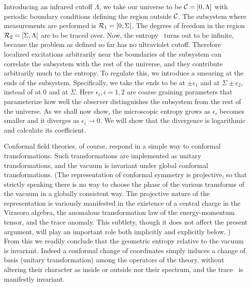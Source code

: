 Introducing
an infrared cutoff $\Lambda$,
we take our universe to be ${\cal C}=[0,\Lambda [$ with
periodic boundary conditions defining the region outside $\cal C$.
The subsystem where measurements are performed is ${\cal R}_1=[0,\Sigma [$.
The degrees of freedom in the region ${\cal R}_2=[\Sigma,\Lambda [$ are to
be traced over.
Now, the entropy \sa~turns out to be
infinite, because the problem as defined so far has
no ultraviolet cutoff.  Therefore localized excitations arbitrarily
near the boundaries of the subsystem can correlate the subsystem
with the rest of the universe, and they contribute arbitrarily much
to the entropy. To regulate this, we introduce a smearing at
the ends of the subsystem.  Specifically, we take the ends to be at
$\pm\epsilon_1$ and at $\Sigma\pm\epsilon_2$, instead of at $0$ and at
$\Sigma$. Here
$\epsilon_i, i=1,2$ are coarse graining
parameters that parameterize how well the observer distinguishes
the subsystem from the rest of the universe.
As we shall now show,
the microscopic entropy grows as $\epsilon_i$ becomes smaller
and it diverges as $\epsilon_i\rightarrow 0$.
We will show that the divergence is logarithmic and calculate its
coefficient.

Conformal field theories, of course,
respond in a simple way to
conformal transformations.
Such transformations are implemented as unitary
transformations, and
the vacuum is
invariant under global conformal transformations.
(The representation of conformal
symmetry is projective, so that strictly speaking there
is no way to choose the phase of the various transforms
of the vacuum in a globally consistent way.  The
projective nature of the representation is variously
manifested in the
existence of a central charge in the Virasoro algebra, the
anomalous transformation law of the energy-momentum tensor, and
the trace anomaly.   This subtlety,
though it does not affect the present argument, will play
an important role both implicitly and explicitly
below. ) From this we readily conclude that the geometric entropy
relative to the vacuum is
invariant.  Indeed a conformal change of coordinates
simply induces a change of basis (unitary transformation)
among the
operators
of the theory, without altering their character
as inside or outside nor their spectrum, and the trace \sa~is manifestly
invariant.

